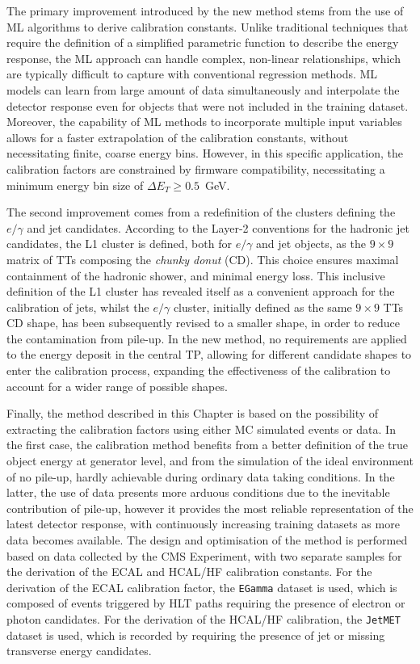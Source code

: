 \bigbreak

The primary improvement introduced by the new method stems from the use of ML algorithms to derive calibration constants. Unlike traditional techniques that require the definition of a simplified parametric function to describe the energy response, the ML approach can handle complex, non-linear relationships, which are typically difficult to capture with conventional regression methods. 
ML models can learn from large amount of data simultaneously and interpolate the detector response even for objects that were not included in the training dataset.
Moreover, the capability of ML methods to incorporate multiple input variables allows for a faster extrapolation of the calibration constants, without necessitating finite, coarse energy bins. However, in this specific application, the calibration factors are constrained by firmware compatibility, necessitating a minimum energy bin size of $\Delta E_T\geq0.5$~GeV.

The second improvement comes from a redefinition of the clusters defining the $e/\gamma$ and jet candidates. 
According to the Layer-2 conventions for the hadronic jet candidates, the L1 cluster is defined, both for $e/\gamma$ and jet objects, as the $9\times9$ matrix of TTs composing the \textit{chunky donut} (CD). This choice ensures maximal containment of the hadronic shower, and minimal energy loss. This inclusive definition of the L1 cluster has revealed itself as a convenient approach for the calibration of jets, whilst the $e/\gamma$ cluster, initially defined as the same $9\times9$ TTs CD shape, has been subsequently revised to a smaller shape, in order to reduce the contamination from pile-up. 
In the new method, no requirements are applied to the energy deposit in the central TP, allowing for different candidate shapes to enter the calibration process, expanding the effectiveness of the calibration to account for a wider range of possible shapes.

Finally, the method described in this Chapter is based on the possibility of extracting the calibration factors using either MC simulated events or data. In the first case, the calibration method benefits from a better definition of the true object energy at generator level, and from the simulation of the ideal environment of no pile-up, hardly achievable during ordinary data taking conditions. In the latter, the use of data presents more arduous conditions due to the inevitable contribution of pile-up, however it provides the most reliable representation of the latest detector response, with continuously increasing training datasets as more data becomes available.
The design and optimisation of the method is performed based on data collected by the CMS Experiment, with two separate samples for the derivation of the ECAL and HCAL/HF calibration constants.
For the derivation of the ECAL calibration factor, the \texttt{EGamma} dataset is used, which is composed of events triggered by HLT paths requiring the presence of electron or photon candidates. For the derivation of the HCAL/HF calibration, the \texttt{JetMET} dataset is used, which is recorded by requiring the presence of jet or missing transverse energy candidates.

